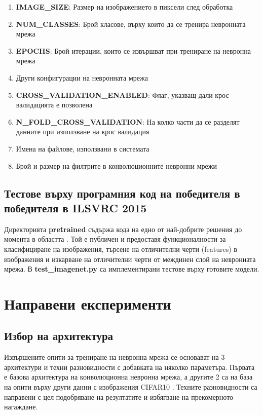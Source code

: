 \begin{enumerate}
\item \textbf{IMAGE\_SIZE}: Размер на изображението в пиксели след обработка
\item \textbf{NUM\_CLASSES}: Брой класове, върху които да се тренира невронната мрежа
\item \textbf{EPOCHS}: Брой итерации, които се извършват при трениране на невронна мрежа
\item Други конфигурации на невронната мрежа
\item \textbf{CROSS\_VALIDATION\_ENABLED}: Флаг, указващ дали крос валидацията е позволена
\item \textbf{N\_FOLD\_CROSS\_VALIDATION}: На колко части да се разделят данните при използване на крос валидация
\item Имена на файлове, използвани в системата
\item Брой и размер на филтрите в конволюционните невронни мрежи
\end{enumerate}

\subsection{Тестове върху програмния код на победителя в победителя в ILSVRC 2015}
Директорията \textbf{pretrained} съдържа кода на едно от най-добрите решения до момента в областта \cite{He2015}. Той е публичен \cite{PretrainedGithub} и предоставя функционалности за класифициране на изображения, търсене на отличителни черти (features) в изображения и изкарване на отличителни черти от междинен слой на невронната мрежа. В \textbf{test\_imagenet.py} са имплементирани тестове върху готовите модели.

\section{Направени експерименти}

\subsection{Избор на архитектура}

Извършените опити за трениране на невронна мрежа се основават на 3 архитектури и техни разновидности с добавката на няколко параметъра. Първата е базова архитектура на конволюционна невронна мрежа, а другите 2 са на база на опити върху други данни с изображения CIFAR10 \cite{KerasTutorial}. Техните разновидности са направени с цел подобряване на резултатите и избягване на прекомерното нагаждане.

